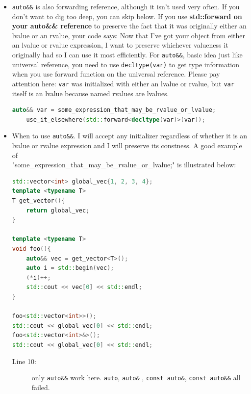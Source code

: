 \documentclass[a4paper,11pt,twoside]{book}
\begin{document}
\begin{itemize}
	\item \texttt{auto\&\&} is also forwarding reference, although it isn't used very often. If you don't want to dig too deep, you can skip below. If you use \textbf{std::forward on your auto\&\& reference} to preserve the fact that it was originally either an lvalue or an rvalue, your code says: Now that I've got your object from either an lvalue or rvalue expression, I want to preserve whichever valueness it originally had so I can use it most efficiently.  For \texttt{auto\&\&}, basic idea just like universal reference, you need to use \texttt{decltype(var)} to get type information when you use forward function on the universal reference. Please pay attention here: \texttt{var} was initialized with either an lvalue or rvalue, but \texttt{var} itself is an lvalue because named rvalues are lvalues.
\begin{lstlisting}[frame=single, language=c++]
	auto&& var = some_expression_that_may_be_rvalue_or_lvalue;
	use_it_elsewhere(std::forward<decltype(var)>(var));
\end{lstlisting}

\item When to use \texttt{auto\&\&}. I will accept any initializer regardless of whether it is an lvalue or rvalue expression and I will preserve its constness. A good example of \\ "some\_expression\_that\_may\_be\_rvalue\_or\_lvalue;" is illustrated below:
\begin{lstlisting}[frame=single, language=c++]
std::vector<int> global_vec{1, 2, 3, 4};	
template <typename T>
T get_vector(){
	return global_vec;
}

template <typename T>
void foo(){
	auto&& vec = get_vector<T>(); 
	auto i = std::begin(vec);
	(*i)++;
	std::cout << vec[0] << std::endl;
}

foo<std::vector<int>>();
std::cout << global_vec[0] << std::endl;
foo<std::vector<int>&>();
std::cout << global_vec[0] << std::endl;	
\end{lstlisting}

\begin{description}
	\item[Line 10:] only \texttt{auto\&\&} work here. \texttt{auto}, \texttt{auto\&} , \texttt{const auto\&}, \texttt{const auto\&\&} all failed.
\end{description}

\end{itemize}
\end{document}
